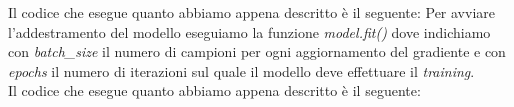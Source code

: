 \newline
Il codice che esegue quanto abbiamo appena descritto è il seguente:
\vspace*{2ex}
\vspace*{2ex}
Per avviare l'addestramento del modello eseguiamo la funzione \textit{model.fit()} dove indichiamo con \textit{batch\_size} il numero di campioni per ogni aggiornamento del gradiente e con \textit{epochs} il numero di iterazioni sul quale il modello deve effettuare il \textit{training}.\\
\newline
Il codice che esegue quanto abbiamo appena descritto è il seguente:
\vspace*{2ex}
\vspace*{2ex}
